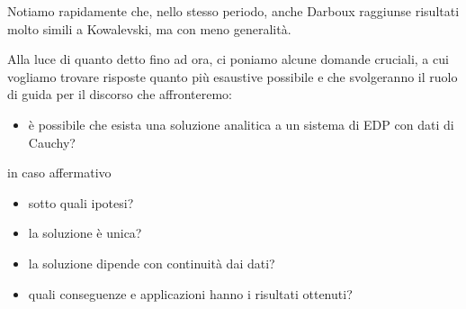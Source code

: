 Notiamo rapidamente che, nello stesso periodo, anche Darboux raggiunse risultati molto simili a Kowalevski, ma con meno generalità.

Alla luce di quanto detto fino ad ora, ci poniamo alcune domande cruciali, a cui vogliamo trovare risposte quanto più esaustive possibile e che svolgeranno il ruolo di guida per il discorso che affronteremo:
\begin{itemize}
\item è possibile che esista una soluzione analitica a un sistema di EDP con dati di Cauchy?
\end{itemize}
in caso affermativo
\begin{itemize}
\item sotto quali ipotesi?
\item la soluzione è unica?
\item la soluzione dipende con continuità dai dati?
\item quali conseguenze e applicazioni hanno i risultati ottenuti?
\end{itemize}



